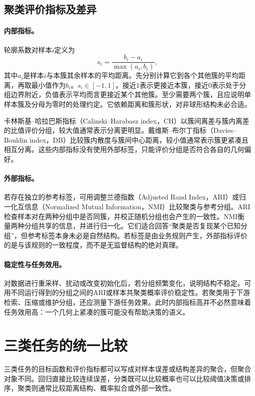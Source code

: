 \subsection{聚类评价指标及差异}
\paragraph{内部指标。}
轮廓系数对样本$i$定义为
\begin{equation}
 s_i=\frac{b_i-a_i}{\max(a_i,b_i)},
 \label{eq:clustering-silhouette}
\end{equation}
其中$a_i$是样本$i$与本簇其余样本的平均距离。先分别计算它到各个其他簇的平均距离，再取最小值作为$b_i$。$s_i\in[-1,1]$。接近$1$表示更接近本簇，接近$0$表示处于分组边界附近，负值表示平均而言更接近某个其他簇。至少需要两个簇，且应说明单样本簇及分母为零时的处理约定。它依赖距离和簇形状，对非球形结构未必合适。

卡林斯基--哈拉巴斯指标（Calinski--Harabasz index，CH）以簇间离差与簇内离差的比值评价分组，较大值通常表示分离更明显。戴维斯--布尔丁指标（Davies--Bouldin index，DB）比较簇内散度与簇间中心距离，较小值通常表示簇更紧凑且相互分离。这些内部指标没有使用外部标签，只能评价分组是否符合各自的几何偏好。

\paragraph{外部指标。}
若存在独立的参考标签，可用调整兰德指数（Adjusted Rand Index，ARI）或归一化互信息（Normalized Mutual Information，NMI）比较聚类与参考分组。ARI检查样本对在两种分组中是否同簇，并校正随机分组也会产生的一致性。NMI衡量两种分组共享的信息，并进行归一化。它们适合回答“聚类是否复现某个已知分组”，但参考标签本身未必是自然结构。若标签是由业务规则产生，外部指标评价的是与该规则的一致程度，而不是无监督结构的绝对真理。

\paragraph{稳定性与任务效用。}
对数据进行重采样、扰动或改变初始化后，若分组频繁变化，说明结构不稳定。可用不同运行得到的分组之间的ARI或样本共聚类概率评价稳定性。若聚类用于下游检索、压缩或维护分组，还应测量下游任务效果。此时内部指标高并不必然意味着任务效用高：一个几何上紧凑的簇可能没有帮助决策的语义。

\section{三类任务的统一比较}
三类任务的目标函数和评价指标都可以写成对样本误差或结构差异的聚合，但聚合对象不同。回归直接比较连续误差，分类既可以比较概率也可以比较阈值决策或排序，聚类则通常比较距离结构、概率拟合或外部一致性。

